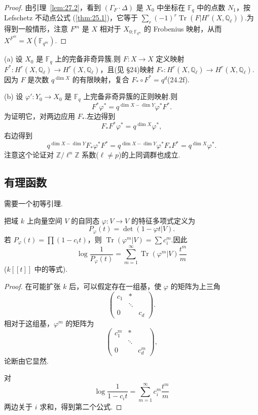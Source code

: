 \begin{proof}
由引理~\ref{lem:27.2}，看到 $(\Gamma_{F} \cdot \Delta)$ 是 $X_0$ 中坐标在 $\mathbb{F}_q$ 中的点数 $N_1$，按 Lefschetz 不动点公式 (\ref{thm:25.1})，它等于 $\sum_{r} (-1)^{r} \operatorname{Tr}(F|H^{r}(X, \mathbb{Q}_{\ell}))$.为得到一般情形，注意 $F^{m}$ 是 $X$ 相对于 $X_{0; \mathbb{F}_{q^m}}$ 的 Frobenius 映射，从而 $X^{F^{m}} = X(\mathbb{F}_{q^m})$.
\end{proof}

\begin{remark}\label{rem:27.4}
(a) 设 $X_0$ 是 $\mathbb{F}_q$ 上的完备非奇异簇.则 $F \colon X \to X$ 定义映射 $F^{*} \colon H^{r}(X, \mathbb{Q}_{\ell}) \to H^{r}(X, \mathbb{Q}_{\ell})$，且(见 \S 24)映射 $F_{*} \colon H^{r}(X, \mathbb{Q}_{\ell}) \to H^{r}(X, \mathbb{Q}_{\ell})$.因为 $F$ 是次数 $q^{\dim X}$ 的有限映射，复合 $F_{*} \circ F^{*} = q^{d}$(24.2f).

(b) 设 $\varphi' \colon Y_0 \to X_0$ 是 $\mathbb{F}_q$ 上完备非奇异簇的正则映射.则
\[
F^{*}\varphi^{*} = q^{\dim X - \dim Y}\varphi^{*}F^{*}.
\]
为证明它，对两边应用 $F_{*}$.左边得到
\[
F_{*}F^{*}\varphi^{*} = q^{\dim X}\varphi^{*},
\]
右边得到
\[
q^{\dim X - \dim Y}F_{*}\varphi^{*}F^{*} = q^{\dim X - \dim Y}\varphi^{*}F_{*}F^{*} = q^{\dim X}\varphi^{*}.
\]
注意这个论证对 $\mathbb{Z}/\ell^{n}\mathbb{Z}$ 系数($\ell \neq p$)的上同调群也成立.
\end{remark}

\subsection*{有理函数}

需要一个初等引理.

\begin{lemma}\label{lem:27.5}
把域 $k$ 上向量空间 $V$ 的自同态 $\varphi \colon V \to V$ 的特征多项式定义为
\[
P_{\varphi}(t) = \det(1 - \varphi t|V).
\]
若 $P_{\varphi}(t) = \prod (1 - c_i t)$，则 $\operatorname{Tr}(\varphi^{m}|V) = \sum c^{m}_i$.因此
\[
\log \frac{1}{P_{\varphi}(t)} = \sum_{m=1}^{\infty} \operatorname{Tr}(\varphi^{m}|V) \frac{t^{m}}{m}
\]
($k[[t]]$ 中的等式).
\end{lemma}

\begin{proof}
在可能扩张 $k$ 后，可以假定存在一组基，使 $\varphi$ 的矩阵为上三角
\[
\begin{pmatrix}
c_1 & *\\
& \ddots\\
0 & & c_d
\end{pmatrix}.
\]
相对于这组基，$\varphi^{m}$ 的矩阵为
\[
\begin{pmatrix}
c^{m}_1 & *\\
& \ddots\\
0 & & c^{m}_d
\end{pmatrix},
\]
论断由它显然.

对
\[
\log \frac{1}{1 - c_i t} = \sum_{m=1}^{\infty} c^{m}_i \frac{t^{m}}{m}
\]
两边关于 $i$ 求和，得到第二个公式.
\end{proof}


